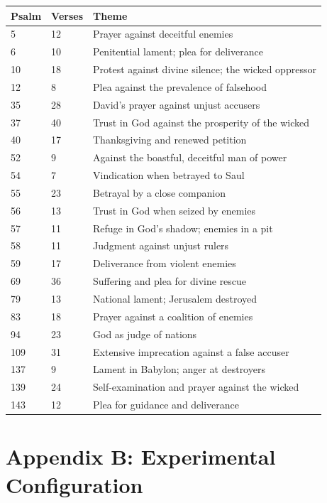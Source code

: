 \documentclass[10pt, letterpaper, twocolumn]{article}
\begin{document}
{\def\LTcaptype{none} %
\begin{tabular}[]{@{}lll@{}}
\toprule\noalign{}
Psalm & Verses & Theme \\
\midrule\noalign{}
\bottomrule\noalign{}
5 & 12 & Prayer against deceitful enemies \\
6 & 10 & Penitential lament; plea for deliverance \\
10 & 18 & Protest against divine silence; the wicked oppressor \\
12 & 8 & Plea against the prevalence of falsehood \\
35 & 28 & David's prayer against unjust accusers \\
37 & 40 & Trust in God against the prosperity of the wicked \\
40 & 17 & Thanksgiving and renewed petition \\
52 & 9 & Against the boastful, deceitful man of power \\
54 & 7 & Vindication when betrayed to Saul \\
55 & 23 & Betrayal by a close companion \\
56 & 13 & Trust in God when seized by enemies \\
57 & 11 & Refuge in God's shadow; enemies in a pit \\
58 & 11 & Judgment against unjust rulers \\
59 & 17 & Deliverance from violent enemies \\
69 & 36 & Suffering and plea for divine rescue \\
79 & 13 & National lament; Jerusalem destroyed \\
83 & 18 & Prayer against a coalition of enemies \\
94 & 23 & God as judge of nations \\
109 & 31 & Extensive imprecation against a false accuser \\
137 & 9 & Lament in Babylon; anger at destroyers \\
139 & 24 & Self-examination and prayer against the wicked \\
143 & 12 & Plea for guidance and deliverance \\
\end{tabular}
}

\section*{Appendix B: Experimental Configuration}\label{appendix-b-experimental-configuration}
\end{document}
